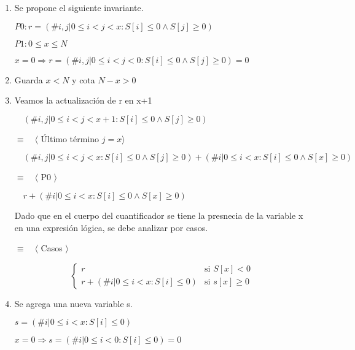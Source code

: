 \documentclass[hidelinks]{article}
\begin{document}
\begin{enumerate}
	\item Se propone el siguiente invariante. \par
	      \begin{center}
		      $P0: r = (\# i,j| 0\leq i < j < x :S[i] \leq 0 \land S[j] \geq 0)$ \par
		      $P1: 0 \leq x \leq N$ \par
	      \end{center}
	      $x = 0 \Rightarrow r = (\# i,j| 0\leq i < j < 0 :S[i] \leq 0 \land S[j] \geq 0) = 0$ \par

	\item Guarda $x<N$ y cota $N-x>0 $

	\item Veamos la actualización de r en x+1 \par
	      $\quad (\# i,j| 0\leq i < j < x+1 :S[i] \leq 0 \land S[j] \geq 0)$ \par
	      $\equiv \quad \langle$ Último término $ j = x \rangle$ \par
	      $\quad (\# i,j| 0\leq i < j < x :S[i] \leq 0 \land S[j] \geq 0) + (\# i| 0\leq i < x :S[i] \leq 0 \land S[x] \geq 0) $ \par
	      $\equiv \quad \langle$ P0 $\rangle$ \par
	      $\quad r + (\# i| 0\leq i < x :S[i] \leq 0 \land S[x] \geq 0)$ \par

	      Dado que en el cuerpo del cuantificador se tiene la presnecia de la variable x
	      en una expresión lógica, se debe analizar por casos.

	      $\equiv \quad \langle$ Casos $\rangle$ \par
	      \begin{equation}
		      \begin{cases}
			      r                                    & \text{si } S[x] < 0    \\
			      r + (\# i| 0\leq i < x :S[i] \leq 0) & \text{si } s[x] \geq 0
		      \end{cases}
	      \end{equation} \par

	\item Se agrega una nueva variable s. \par
	      $s = (\# i| 0\leq i < x :S[i] \leq 0)$ \par
	      $x=0 \Rightarrow s = (\# i| 0\leq i < 0 :S[i] \leq 0)=0$ \par


\end{enumerate}
\end{document}
